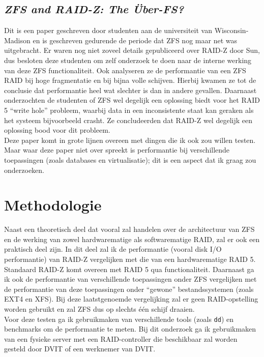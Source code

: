 \documentclass[fleqn,10pt]{voorstel}
\begin{document}
\subsection{\textit{ZFS and RAID-Z: The \"{U}ber-FS?} \autocite{BrianHickmann2007}}

Dit is een paper geschreven door studenten aan de universiteit van Wisconsin-Madison en is geschreven gedurende de periode dat ZFS nog maar net was uitgebracht. Er waren nog niet zoveel details gepubliceerd over RAID-Z door Sun, dus besloten deze studenten om zelf onderzoek te doen naar de interne werking van deze ZFS functionaliteit. Ook analyseren ze de performantie van een ZFS RAID bij hoge fragmentatie en bij bijna volle schijven. Hierbij kwamen ze tot de conclusie dat performantie heel wat slechter is dan in andere gevallen. Daarnaast onderzochten de studenten of ZFS wel degelijk een oplossing biedt voor het RAID 5 ``write hole'' probleem, waarbij data in een inconsistente staat kan geraken als het systeem bijvoorbeeld crasht. Ze  concludeerden dat RAID-Z wel degelijk een oplossing bood voor dit probleem. \\
Deze paper komt in grote lijnen overeen met dingen die ik ook zou willen testen. Maar waar deze paper niet over spreekt is performantie bij verschillende toepassingen (zoals databases en virtualisatie); dit is een aspect dat ik graag zou onderzoeken.

\section{Methodologie}
\label{sec:methodologie}


Naast een theoretisch deel dat vooral zal handelen over de architectuur van ZFS en de werking van zowel hardwarematige als softwarematige RAID, zal er ook een praktisch deel zijn. In dit deel zal ik de performantie (vooral disk I/O performantie) van RAID-Z vergelijken met die van een hardwarematige RAID 5. Standaard RAID-Z komt overeen met RAID 5 qua functionaliteit. Daarnaast ga ik ook de performantie van verschillende toepassingen onder ZFS vergelijken met de performantie van deze toepassingen onder ``gewone'' bestandssystemen (zoals EXT4 en XFS). Bij deze laatstgenoemde vergelijking zal er geen RAID-opstelling worden gebruikt en zal ZFS dus op slechts één schijf draaien. \\
Voor deze testen ga ik gebruikmaken van verschillende tools (zoals \texttt{dd}) en benchmarks om de performantie te meten. Bij dit onderzoek ga ik gebruikmaken van een fysieke server met een RAID-controller die beschikbaar zal worden gesteld door DVIT of een werknemer van DVIT.
\end{document}
